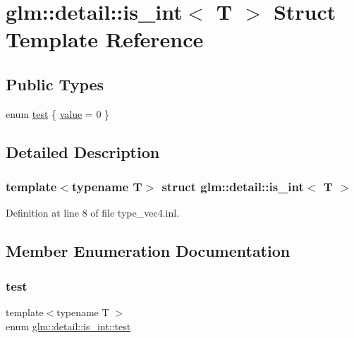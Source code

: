 \hypertarget{structglm_1_1detail_1_1is__int}{}\section{glm\+::detail\+::is\+\_\+int$<$ T $>$ Struct Template Reference}
\label{structglm_1_1detail_1_1is__int}
\subsection*{Public Types}
\begin{DoxyCompactItemize}
\item 
enum \mbox{\hyperlink{structglm_1_1detail_1_1is__int_a6a1d15bd1184bc07664114fa30199e01}{test}} \{ \mbox{\hyperlink{structglm_1_1detail_1_1is__int_a6a1d15bd1184bc07664114fa30199e01a788143fb0374c29be9a2f50e5c493c1b}{value}} = 0
 \}
\end{DoxyCompactItemize}


\subsection{Detailed Description}
\subsubsection*{template$<$typename T$>$\newline
struct glm\+::detail\+::is\+\_\+int$<$ T $>$}



Definition at line 8 of file type\+\_\+vec4.\+inl.



\subsection{Member Enumeration Documentation}
\mbox{\label{structglm_1_1detail_1_1is__int_a6a1d15bd1184bc07664114fa30199e01}} 
\subsubsection{\texorpdfstring{test}{test}}
{\footnotesize\ttfamily template$<$typename T $>$ \\
enum \mbox{\hyperlink{structglm_1_1detail_1_1is__int_a6a1d15bd1184bc07664114fa30199e01}{glm\+::detail\+::is\+\_\+int\+::test}}}

